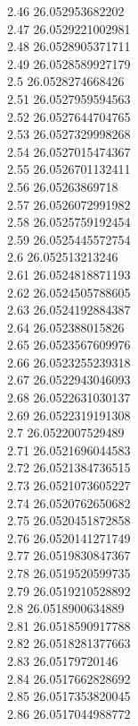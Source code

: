 {2.46	26.052953682202\\
2.47	26.0529221002981\\
2.48	26.0528905371711\\
2.49	26.0528589927179\\
2.5	26.0528274668426\\
2.51	26.0527959594563\\
2.52	26.0527644704765\\
2.53	26.0527329998268\\
2.54	26.0527015474367\\
2.55	26.0526701132411\\
2.56	26.05263869718\\
2.57	26.0526072991982\\
2.58	26.0525759192454\\
2.59	26.0525445572754\\
2.6	26.052513213246\\
2.61	26.0524818871193\\
2.62	26.0524505788605\\
2.63	26.0524192884387\\
2.64	26.052388015826\\
2.65	26.0523567609976\\
2.66	26.0523255239318\\
2.67	26.0522943046093\\
2.68	26.0522631030137\\
2.69	26.0522319191308\\
2.7	26.0522007529489\\
2.71	26.0521696044583\\
2.72	26.0521384736515\\
2.73	26.0521073605227\\
2.74	26.0520762650682\\
2.75	26.0520451872858\\
2.76	26.0520141271749\\
2.77	26.0519830847367\\
2.78	26.0519520599735\\
2.79	26.0519210528892\\
2.8	26.0518900634889\\
2.81	26.0518590917788\\
2.82	26.0518281377663\\
2.83	26.05179720146\\
2.84	26.0517662828692\\
2.85	26.0517353820045\\
2.86	26.0517044988772\\
}
